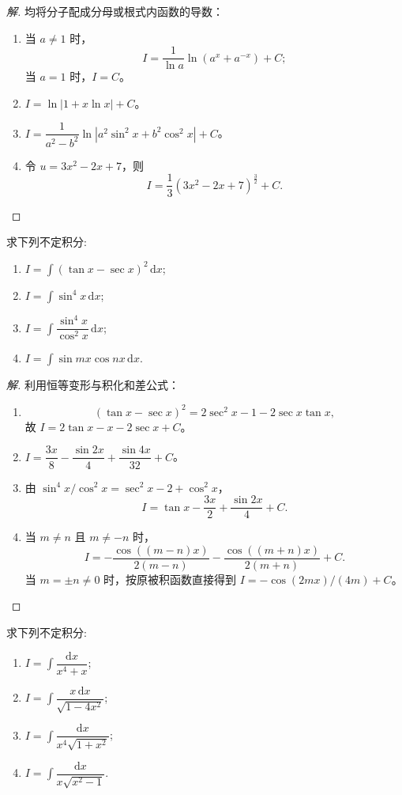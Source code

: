 \documentclass[../../数学分析培优讲义(答案版).tex]{subfiles}
\begin{document}
\begin{proof}[解]
均将分子配成分母或根式内函数的导数：
\begin{enumerate}[label=(\arabic*)]
    \item 当 $a\neq1$ 时，
    \[
        I=\dfrac{1}{\ln a}\ln(a^x+a^{-x})+C;
    \]
    当 $a=1$ 时，$I=C$。
    \item $\displaystyle I=\ln|1+x\ln x|+C$。
    \item $\displaystyle I=\dfrac{1}{a^2-b^2}\ln|a^2\sin^2x+b^2\cos^2x|+C$。
    \item 令 $u=3x^2-2x+7$，则
    \[
        I=\dfrac{1}{3}(3x^2-2x+7)^{\frac{3}{2}}+C.
    \]
\end{enumerate}
\end{proof}

\begin{example}
求下列不定积分:
\begin{enumerate}[label=(\arabic*)]
    \item $\displaystyle I=\int(\tan x-\sec x)^2\,\mathrm{d}x$;
    \item $\displaystyle I=\int\sin^4x\,\mathrm{d}x$;
    \item $\displaystyle I=\int\dfrac{\sin^4x}{\cos^2x}\,\mathrm{d}x$;
    \item $\displaystyle I=\int\sin mx\cos nx\,\mathrm{d}x$.
\end{enumerate}
\end{example}

\begin{proof}[解]
利用恒等变形与积化和差公式：
\begin{enumerate}[label=(\arabic*)]
    \item
    \[
        (\tan x-\sec x)^2=2\sec^2x-1-2\sec x\tan x,
    \]
    故 $I=2\tan x-x-2\sec x+C$。
    \item $\displaystyle I=\dfrac{3x}{8}-\dfrac{\sin2x}{4}+\dfrac{\sin4x}{32}+C$。
    \item 由 $\sin^4x/\cos^2x=\sec^2x-2+\cos^2x$，
    \[
        I=\tan x-\dfrac{3x}{2}+\dfrac{\sin2x}{4}+C.
    \]
    \item 当 $m\neq n$ 且 $m\neq-n$ 时，
    \[
        I=-\dfrac{\cos((m-n)x)}{2(m-n)}
        -\dfrac{\cos((m+n)x)}{2(m+n)}+C.
    \]
    当 $m=\pm n\neq0$ 时，按原被积函数直接得到
    $I=-\cos(2mx)/(4m)+C$。
\end{enumerate}
\end{proof}

\begin{example}
求下列不定积分:
\begin{enumerate}[label=(\arabic*)]
    \item $\displaystyle I=\int\dfrac{\mathrm{d}x}{x^4+x}$;
    \item $\displaystyle I=\int\dfrac{x\,\mathrm{d}x}{\sqrt{1-4x^2}}$;
    \item $\displaystyle I=\int\dfrac{\mathrm{d}x}{x^4\sqrt{1+x^2}}$;
    \item $\displaystyle I=\int\dfrac{\mathrm{d}x}{x\sqrt{x^2-1}}$.
\end{enumerate}
\end{example}
\end{document}
